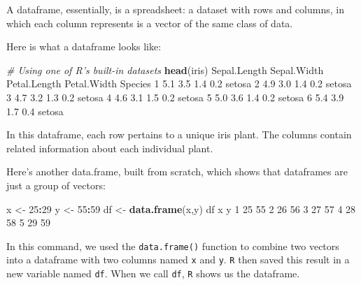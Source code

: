 \documentclass[]{book}
\newenvironment{Shaded}{\begin{snugshade}}{\end{snugshade}}
\newcommand{\CommentTok}[1]{\textcolor[rgb]{0.56,0.35,0.01}{\textit{#1}}}
\newcommand{\DecValTok}[1]{\textcolor[rgb]{0.00,0.00,0.81}{#1}}
\newcommand{\FloatTok}[1]{\textcolor[rgb]{0.00,0.00,0.81}{#1}}
\newcommand{\KeywordTok}[1]{\textcolor[rgb]{0.13,0.29,0.53}{\textbf{#1}}}
\newcommand{\NormalTok}[1]{#1}
\newcommand{\OperatorTok}[1]{\textcolor[rgb]{0.81,0.36,0.00}{\textbf{#1}}}
\newcommand{\StringTok}[1]{\textcolor[rgb]{0.31,0.60,0.02}{#1}}
\begin{document}
A dataframe, essentially, is a spreadsheet: a dataset with rows and columns, in which each column represents is a vector of the same class of data.

Here is what a dataframe looks like:

\begin{Shaded}
\begin{Highlighting}[]
\CommentTok{# Using one of R's built-in datasets}
\KeywordTok{head}\NormalTok{(iris)}
\NormalTok{  Sepal.Length Sepal.Width Petal.Length Petal.Width Species}
\DecValTok{1}          \FloatTok{5.1}         \FloatTok{3.5}          \FloatTok{1.4}         \FloatTok{0.2}\NormalTok{  setosa}
\DecValTok{2}          \FloatTok{4.9}         \FloatTok{3.0}          \FloatTok{1.4}         \FloatTok{0.2}\NormalTok{  setosa}
\DecValTok{3}          \FloatTok{4.7}         \FloatTok{3.2}          \FloatTok{1.3}         \FloatTok{0.2}\NormalTok{  setosa}
\DecValTok{4}          \FloatTok{4.6}         \FloatTok{3.1}          \FloatTok{1.5}         \FloatTok{0.2}\NormalTok{  setosa}
\DecValTok{5}          \FloatTok{5.0}         \FloatTok{3.6}          \FloatTok{1.4}         \FloatTok{0.2}\NormalTok{  setosa}
\DecValTok{6}          \FloatTok{5.4}         \FloatTok{3.9}          \FloatTok{1.7}         \FloatTok{0.4}\NormalTok{  setosa}
\end{Highlighting}
\end{Shaded}

In this dataframe, each row pertains to a unique iris plant. The columns contain related information about each individual plant.

Here's another data.frame, built from scratch, which shows that dataframes are just a group of vectors:

\begin{Shaded}
\begin{Highlighting}[]
\NormalTok{x <-}\StringTok{ }\DecValTok{25}\OperatorTok{:}\DecValTok{29}
\NormalTok{y <-}\StringTok{ }\DecValTok{55}\OperatorTok{:}\DecValTok{59}
\NormalTok{df <-}\StringTok{ }\KeywordTok{data.frame}\NormalTok{(x,y)}
\NormalTok{df}
\NormalTok{   x  y}
\DecValTok{1} \DecValTok{25} \DecValTok{55}
\DecValTok{2} \DecValTok{26} \DecValTok{56}
\DecValTok{3} \DecValTok{27} \DecValTok{57}
\DecValTok{4} \DecValTok{28} \DecValTok{58}
\DecValTok{5} \DecValTok{29} \DecValTok{59}
\end{Highlighting}
\end{Shaded}

In this command, we used the \texttt{data.frame()} function to combine two vectors into a dataframe with two columns named \texttt{x} and \texttt{y}. \texttt{R} then saved this result in a new variable named \texttt{df}. When we call \texttt{df}, \texttt{R} shows us the dataframe.
\end{document}
